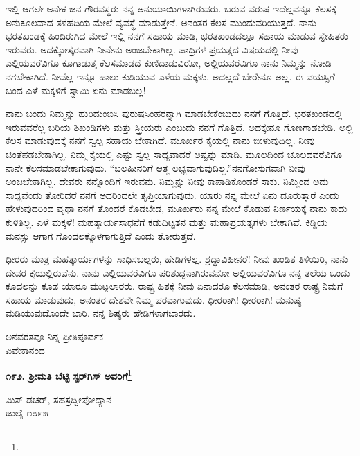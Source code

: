 ಇಲ್ಲಿ ಆಗಲೇ ಅನೇಕ ಜನ ಗೌರವಸ್ಥರು ನನ್ನ ಅನುಯಾಯಿಗಳಾಗಿರುವರು. ಬರುವ ವರುಷ ಇದೆಲ್ಲವನ್ನೂ ಕೆಲಸಕ್ಕೆ ಅನುಕೂಲವಾದ ತಳಹದಿಯ ಮೇಲೆ ವ್ಯವಸ್ಥೆ ಮಾಡುತ್ತೇನೆ. ಅನಂತರ ಕೆಲಸ ಮುಂದುವರಿಯುತ್ತದೆ. ನಾನು ಭರತಖಂಡಕ್ಕೆ ಹಿಂದಿರುಗಿದ ಮೇಲೆ ಇಲ್ಲಿ ನನಗೆ ಸಹಾಯ ಮಾಡಿ, ಭರತಖಂಡದಲ್ಲೂ ಸಹಾಯ ಮಾಡುವ ಸ್ನೇಹಿತರು ಇರುವರು. ಅದಕ್ಕೋಸ್ಕರವಾಗಿ ನೀನೇನು ಅಂಜಬೇಕಾಗಿಲ್ಲ. ಪಾದ್ರಿಗಳ ಪ್ರಯತ್ನದ ವಿಷಯದಲ್ಲಿ ನೀವು ಎಲ್ಲಿಯವರೆವಿಗೂ ಕೂಗಾಡುತ್ತ ಕೆಲಸಮಾಡದೆ ಕುಣಿದಾಡುವಿರೋ, ಅಲ್ಲಿಯವರೆವಿಗೂ ನಾನು ನಿಮ್ಮನ್ನು ನೋಡಿ ನಗಬೇಕಾಗಿದೆ. ನೀವೆಲ್ಲ ಇನ್ನೂ ಹಾಲು ಕುಡಿಯುವ ಎಳೆಯ ಮಕ್ಕಳು. ಅದಲ್ಲದೆ ಬೇರೇನೂ ಅಲ್ಲ. ಈ ವಯಸ್ಸಿಗೆ ಬಂದ ಎಳೆ ಮಕ್ಕಳಿಗೆ ಸ್ವಾಮಿ ಏನು ಮಾಡಬಲ್ಲ!

ನಾನು ಬಂದು ನಿಮ್ಮನ್ನು ಹುರಿದುಂಬಿಸಿ ಪುರುಷಸಿಂಹರನ್ನಾಗಿ ಮಾಡಬೇಕೆಂಬುದು ನನಗೆ ಗೊತ್ತಿದೆ. ಭರತಖಂಡದಲ್ಲಿ ಇರುವವರೆಲ್ಲ ಬರಿಯ ಶಿಖಂಡಿಗಳು ಮತ್ತು ಸ್ತ್ರೀಯರು ಎಂಬುದು ನನಗೆ ಗೊತ್ತಿದೆ. ಅದಕ್ಕೇನೂ ಗೊಣಗಾಡಬೇಡಿ. ಅಲ್ಲಿ ಕೆಲಸ ಮಾಡುವುದಕ್ಕೆ ನನಗೆ ಸ್ವಲ್ಪ ಸಹಾಯ ಬೇಕಾಗಿದೆ. ಮೂರ್ಖರ ಕೈಯಲ್ಲಿ ನಾನು ಬೀಳುವುದಿಲ್ಲ. ನೀವು ಚಿಂತೆಪಡಬೇಕಾಗಿಲ್ಲ. ನಿಮ್ಮ ಕೈಯಲ್ಲಿ ಎಷ್ಟು ಸ್ವಲ್ಪ ಸಾಧ್ಯವಾದರೆ ಅಷ್ಟನ್ನು ಮಾಡಿ. ಮೂಲದಿಂದ ಚೂಲದವರೆವಿಗೂ ನಾನೇ ಕೆಲಸಮಾಡಬೇಕಾಗುವುದು. “ಬಲಹೀನರಿಗೆ ಆತ್ಮ ಲಭ್ಯವಾಗುವುದಿಲ್ಲ.''ನನಗೋಸುಗವಾಗಿ ನೀವು ಅಂಜಬೇಕಾಗಿಲ್ಲ. ದೇವರು ನನ್ನೊಂದಿಗೆ ಇರುವನು. ನಿಮ್ಮನ್ನು ನೀವು ಕಾಪಾಡಿಕೊಂಡರೆ ಸಾಕು. ನಿಮ್ಮಿಂದ ಅದು ಸಾಧ್ಯವೆಂದು ತೋರಿದರೆ ನನಗೆ ಅದರಿಂದಲೇ ತೃಪ್ತಿಯಾಗುವುದು. ಯಾರು ನನ್ನ ಮೇಲೆ ಏನು ದೂರುತ್ತಾರೆ ಎಂದು ಹೇಳುವುದರಿಂದ ವೃಥಾ ನನಗೆ ತೊಂದರೆ ಕೊಡಬೇಡ, ಮೂರ್ಖರು ನನ್ನ ಮೇಲೆ ಕೊಡುವ ನಿರ್ಣಯಕ್ಕೆ ನಾನು ಕಾದು ಕುಳಿತಿಲ್ಲ. ಎಳೆ ಮಕ್ಕಳೆ! ಮಹತ್ಕಾರ್ಯಸಾಧನೆಗೆ ಕಡುದಿಟ್ಟತನ ಮತ್ತು ಮಹಾಪ್ರಯತ್ನಗಳು ಬೇಕಾಗಿವೆ. ಕಿಡ್ಡಿಯ ಮನಸ್ಸು ಆಗಾಗ ಗೊಂದಲಕ್ಕೊಳಗಾಗುತ್ತಿದೆ ಎಂದು ತೋರುತ್ತದೆ.

ಧೀರರು ಮಾತ್ರ ಮಹತ್ಕಾರ್ಯಗಳನ್ನು ಸಾಧಿಸಬಲ್ಲರು, ಹೇಡಿಗಳಲ್ಲ. ಶ್ರದ್ಧಾವಿಹೀನರೆ! ನೀವು ಖಂಡಿತ ತಿಳಿಯಿರಿ, ನಾನು ದೇವರ ಕೈಯಲ್ಲಿರುವೆನು. ನಾನು ಎಲ್ಲಿಯವರೆವಿಗೂ ಪರಿಶುದ್ದನಾಗಿರುವನೋ ಅಲ್ಲಿಯವರೆವಿಗೂ ನನ್ನ ತಲೆಯ ಒಂದು ಕೂದಲನ್ನು ಕೂಡ ಯಾರೂ ಮುಟ್ಟಲಾರರು. ರಾಷ್ಟ್ರ ಹಿತಕ್ಕೆ ನೀವು ಏನಾದರೂ ಕೆಲಸಮಾಡಿ, ಅನಂತರ ರಾಷ್ಟ್ರ ನಿಮಗೆ ಸಹಾಯ ಮಾಡುವುದು, ಅನಂತರ ದೇಶವೇ ನಿಮ್ಮ ಪರವಾಗುವುದು. ಧೀರರಾಗಿ! ಧೀರರಾಗಿ! ಮನುಷ್ಯ ಮಡಿಯುವುದೊಂದೇ ಬಾರಿ. ನನ್ನ ಶಿಷ್ಯರು ಹೇಡಿಗಳಾಗ\break ಬಾರದು.

\vspace{-0.5cm}

{\flushright
ಅನವರತವೂ ನಿನ್ನ ಪ್ರೀತಿಪೂರ್ವಕ\\ವಿವೇಕಾನಂದ\par}

\begin{center}
\textbf{೧೯೨. ಶ‍್ರೀಮತಿ ಬೆಟ್ಟಿ ಸ್ಟರ್‌ಗಿಸ್ ಅವರಿಗೆ}\footnote{}
\end{center}

\vspace{-0.5cm}

\begin{flushright}
 ಮಿಸ್ ಡಚರ್‌, ಸಹಸ್ರದ್ವೀಪೋದ್ಯಾನ\\ಜುಲೈ ೧೮೯೫
\end{flushright}


